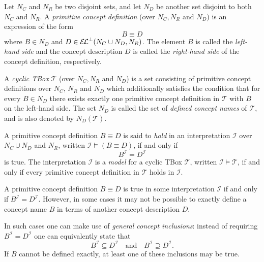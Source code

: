 \begin{Definition}
  \label{def:primitive-concept-definitions-cyclic-TBoxes}
  Let $N_C$ and $N_R$ be two disjoint sets, and let $N_D$ be another set disjoint to both
  $N_C$ and $N_R$.  A \emph{primitive concept definition} (over $N_C, N_R$ and $N_D$) is
  an expression of the form
  \begin{equation*}
    B \equiv D
  \end{equation*}
  where $B \in N_D$ and $D \in {\ensuremath{{\mathcal{E}\kern-.3ex\mathcal{L}}^\bot}}(N_C \cup N_D, N_R)$.  The element $B$ is called the
  \emph{left-hand side} and the concept description $D$ is called the \emph{right-hand
    side} of the concept definition, respectively.

  A \emph{cyclic TBox} $\mathcal{T}$ (over $N_C, N_R$ and $N_D$) is a set consisting of
  primitive concept definitions over $N_C$, $N_R$ and $N_D$ which additionally satisfies
  the condition that for every $B \in N_D$ there exists exactly one primitive concept
  definition in $\mathcal{T}$ with $B$ on the left-hand side.  The set $N_D$ is called the
  set of \emph{defined concept names} of $\mathcal{T}$, and is also denoted by
  $N_D(\mathcal{T})$.

  A primitive concept definition $B \equiv D$ is said to \emph{hold} in an interpretation
  $\mathcal{I}$ over $N_C \cup N_D$ and $N_R$, written $\mathcal{I} \models (B \equiv D)$,
  if and only if
  \begin{equation*}
    B^{\mathcal{I}} = D^{\mathcal{I}}
  \end{equation*}
  is true.  The interpretation $\mathcal{I}$ is a \emph{model} for a cyclic TBox
  $\mathcal{T}$, written $\mathcal{I} \models \mathcal{T}$, if and only if every primitive
  concept definition in $\mathcal{T}$ holds in $\mathcal{I}$.
\end{Definition}

A primitive concept definition $B \equiv D$ is true in some interpretation $\mathcal{I}$
if and only if $B^{\mathcal{I}} = D^{\mathcal{I}}$.  However, in some cases it may not be
possible to exactly define a concept name $B$ in terms of another concept description
$D$.

In such cases one can make use of \emph{general concept inclusions}: instead of requiring
$B^{\mathcal{I}} = D^{\mathcal{I}}$ one can equivalently state that
\begin{equation*}
  B^{\mathcal{I}} \subseteq D^{\mathcal{I}} \quad\text{and}\quad B^{\mathcal{I}} \supseteq D^{\mathcal{I}}.
\end{equation*}
If $B$ cannot be defined exactly, at least one of these inclusions may be true.

